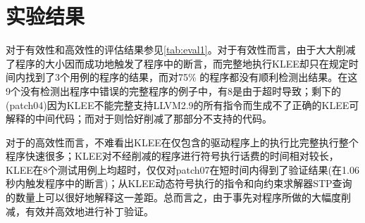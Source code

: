 \section{实验结果}
\label{sec:experiment_res}
对于\dryrun 有效性和高效性的评估结果参见\autoref{tab:eval1}。对于有效性而言，\dryrun 由于大大削减了程序的大小因而成功地触发了程序中的断言，而完整地执行KLEE却只在规定时间内找到了3个用例的程序的结果，而对75\% 的程序都没有顺利检测出结果。在这9个没有检测出程序中错误的完整程序的例子中，有8是由于超时导致；剩下的(patch04)因为KLEE不能完整支持LLVM2.9的所有指令而生成不了正确的KLEE可解释的中间代码；而对于\rbscope 则恰好削减了那部分不支持的代码。

对于\dryrun 的高效性而言，不难看出KLEE在仅包含\rbscope 的驱动程序上的执行比完整执行整个程序快速很多；KLEE对不经削减的程序进行符号执行话费的时间相对较长，KLEE在8个测试用例上均超时，仅仅对patch07在短时间内得到了验证结果(在1.06秒内触发程序中的断言)；从KLEE动态符号执行的指令和向约束求解器STP查询的数量上可以很好地解释这一差距。总而言之，由于事先对程序所做的大幅度削减，\dryrun 有效并高效地进行补丁验证。

